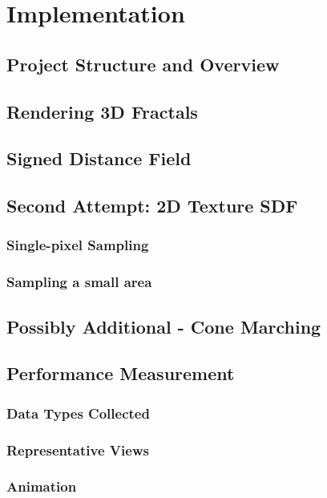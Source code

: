 \chapter{Implementation}
\label{chapter3}

\section{Project Structure and Overview}

\section{Rendering 3D Fractals}

\section{Signed Distance Field}

\section{Second Attempt: 2D Texture SDF}

\subsection{Single-pixel Sampling}

\subsection{Sampling a small area}

\section{Possibly Additional - Cone Marching}

\section{Performance Measurement}

\subsection{Data Types Collected}

\subsection{Representative Views}

\subsection{Animation}